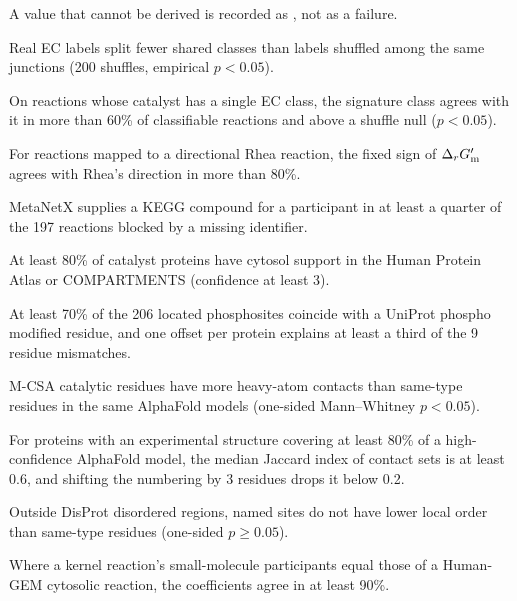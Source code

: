 \begin{description}[style=nextline,leftmargin=1.2cm,itemsep=3pt]
A value that cannot be derived is recorded as , not as a failure.
\item[E5] Real EC labels split fewer shared classes than labels shuffled among the same junctions (200 shuffles, empirical $p<0.05$).
\item[E6] On reactions whose catalyst has a single EC class, the signature class agrees with it in more than 60\% of classifiable reactions and above a shuffle null ($p<0.05$).
\item[R1] For reactions mapped to a directional Rhea reaction, the fixed sign of $\Delta_r G'_{\mathrm{m}}$ agrees with Rhea's direction in more than 80\%.
\item[I1] MetaNetX supplies a KEGG compound for a participant in at least a quarter of the 197 reactions blocked by a missing identifier.
\item[L1] At least 80\% of catalyst proteins have cytosol support in the Human Protein Atlas or COMPARTMENTS (confidence at least 3).
\item[S1] At least 70\% of the 206 located phosphosites coincide with a UniProt phospho modified residue, and one offset per protein explains at least a third of the 9 residue mismatches.
\item[C1] M-CSA catalytic residues have more heavy-atom contacts than same-type residues in the same AlphaFold models (one-sided Mann--Whitney $p<0.05$).
\item[A1] For proteins with an experimental structure covering at least 80\% of a high-confidence AlphaFold model, the median Jaccard index of contact sets is at least 0.6, and shifting the numbering by 3 residues drops it below 0.2.
\item[D1] Outside DisProt disordered regions, named sites do not have lower local order than same-type residues (one-sided $p\ge0.05$).
\item[G1] Where a kernel reaction's small-molecule participants equal those of a Human-GEM cytosolic reaction, the coefficients agree in at least 90\%.
\end{description}

